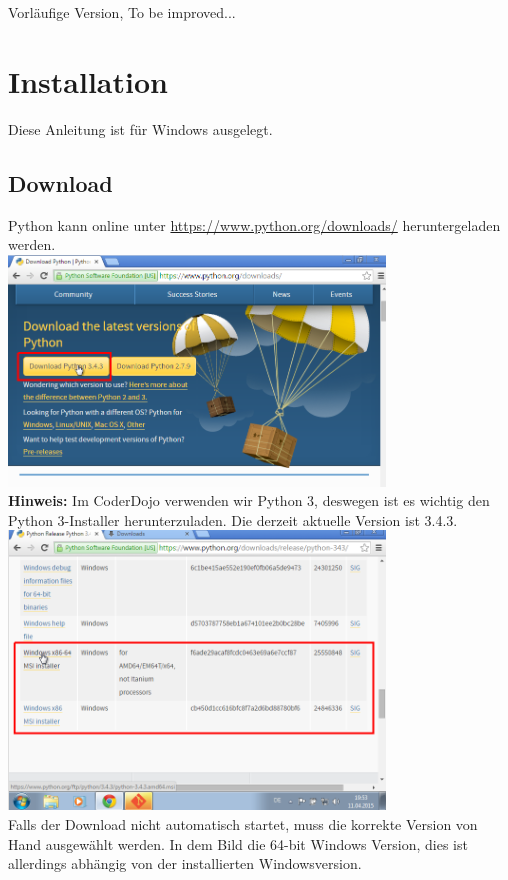 \documentclass[ngerman,oneside, a4letter]{scrbook}
\begin{document}
{\huge Vorläufige Version, To be improved...}

\section{Installation}
Diese Anleitung ist für Windows ausgelegt.

\subsection{Download}
Python kann online unter \url{https://www.python.org/downloads/} heruntergeladen werden.
\\


\includegraphics[width=100mm]{bilder/python_download}
\\
\textbf{Hinweis:} Im CoderDojo verwenden wir Python 3, deswegen ist es wichtig den Python 3-Installer herunterzuladen. Die derzeit aktuelle Version ist 3.4.3.
\\
\includegraphics[width=100mm]{bilder/python_download_win}
\\
Falls der Download nicht automatisch startet, muss die korrekte Version von Hand ausgewählt werden. In dem Bild die 64-bit Windows Version, dies ist allerdings abhängig von der installierten Windowsversion.
\end{document}
